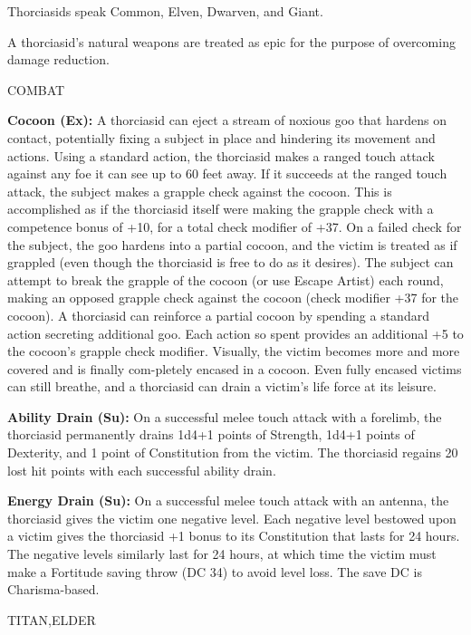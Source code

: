 \documentclass{article}
\begin{document}
{Thorciasids speak Common, Elven, Dwarven, and Giant. 

A thorciasid's natural weapons are treated as epic for the purpose of overcoming 
damage reduction.

COMBAT 

\textbf{Cocoon (Ex):} A thorciasid can eject a stream of noxious goo that hardens 
on contact, potentially fixing a subject in place and hindering its movement and 
actions. Using a standard action, the thorciasid makes a ranged touch attack against 
any foe it can see up to 60 feet away. If it succeeds at the ranged touch attack, 
the subject makes a grapple check against the cocoon. This is accomplished as if 
the thorciasid itself were making the grapple check with a competence bonus of 
+10, for a total check modifier of +37. On a failed check for the subject, the 
goo hardens into a partial cocoon, and the victim is treated as if grappled (even 
though the thorciasid is free to do as it desires). The subject can attempt to 
break the grapple of the cocoon (or use Escape Artist) each round, making an opposed 
grapple check against the cocoon (check modifier +37 for the cocoon). A thorciasid 
can reinforce a partial cocoon by spending a standard action secreting additional 
goo. Each action so spent provides an additional +5 to the cocoon's grapple check 
modifier. Visually, the victim becomes more and more covered and is finally com-pletely 
encased in a cocoon. Even fully encased victims can still breathe, and a thorciasid 
can drain a victim's life force at its leisure. 

\textbf{Ability Drain (Su):} On a successful melee touch attack with a forelimb, 
the thorciasid permanently drains 1d4+1 points of Strength, 1d4+1 points of Dexterity, 
and 1 point of Constitution from the victim. The thorciasid regains 20 lost hit 
points with each successful ability drain. 

\textbf{Energy Drain (Su): }On a successful melee touch attack with an antenna, 
the thorciasid gives the victim one negative level. Each negative level bestowed 
upon a victim gives the thorciasid +1 bonus to its Constitution that lasts for 
24 hours. The negative levels similarly last for 24 hours, at which time the victim 
must make a Fortitude saving throw (DC 34) to avoid level loss. The save DC is 
Charisma-based.

\vspace{12pt}
{\LARGE{}TITAN,ELDER }

}
\end{document}
